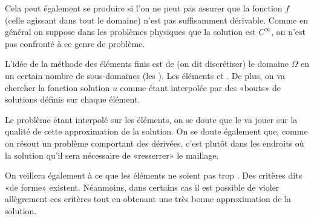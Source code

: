 Cela peut également se produire si l'on ne peut pas assurer que la fonction $f$
(celle agissant dans tout le domaine) n'est pas suffisamment dérivable.
Comme en général on suppose dans les problèmes physiques que la solution est $C^\infty$,
on n'est pas confronté à ce genre de problème.

\medskip
L'idée de la méthode des éléments finis est de  (on dit discrétiser) le domaine $\Omega$
en un certain nombre de sous-domaines (les ).
Les éléments 
et 
.
De plus, on va chercher la fonction solution $u$ comme étant interpolée par des «bouts»
de solutions définis sur chaque élément.

\medskip
Le problème étant interpolé sur les éléments, on se doute que le
 va jouer sur la qualité de cette approximation de la solution.
On se doute également que, comme on résout un problème comportant des
dérivées, c'est plutôt dans les endroits où la solution  qu'il
sera nécessaire de «resserrer» le maillage.

\medskip
On veillera également à ce que les éléments ne soient pas trop . Des critères dits «de forme» existent. Néanmoins, dans certains cas il est possible de violer allègrement ces critères tout en obtenant une très bonne approximation de la solution.

